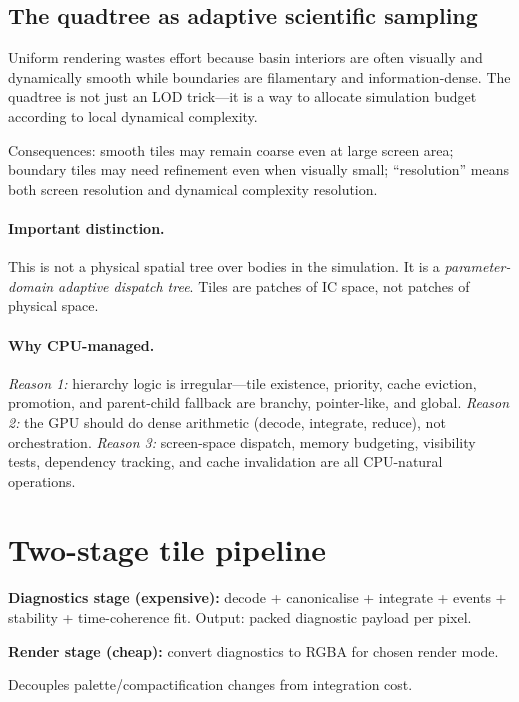 \documentclass[11pt]{report}
\begin{document}
\subsection{The quadtree as adaptive scientific sampling}

Uniform rendering wastes effort because basin interiors are often visually and dynamically smooth while boundaries are filamentary and information-dense. The quadtree is not just an LOD trick---it is a way to allocate simulation budget according to local dynamical complexity.

Consequences: smooth tiles may remain coarse even at large screen area; boundary tiles may need refinement even when visually small; ``resolution'' means both screen resolution and dynamical complexity resolution.

\paragraph{Important distinction.} This is not a physical spatial tree over bodies in the simulation. It is a \emph{parameter-domain adaptive dispatch tree}. Tiles are patches of IC space, not patches of physical space.

\paragraph{Why CPU-managed.} \emph{Reason 1:} hierarchy logic is irregular---tile existence, priority, cache eviction, promotion, and parent-child fallback are branchy, pointer-like, and global. \emph{Reason 2:} the GPU should do dense arithmetic (decode, integrate, reduce), not orchestration. \emph{Reason 3:} screen-space dispatch, memory budgeting, visibility tests, dependency tracking, and cache invalidation are all CPU-natural operations.

\section{Two-stage tile pipeline}
\label{sec:two_stage}

\textbf{Diagnostics stage (expensive):} decode + canonicalise + integrate + events + stability + time-coherence fit. Output: packed diagnostic payload per pixel.

\textbf{Render stage (cheap):} convert diagnostics to RGBA for chosen render mode.

Decouples palette/compactification changes from integration cost.
\end{document}
